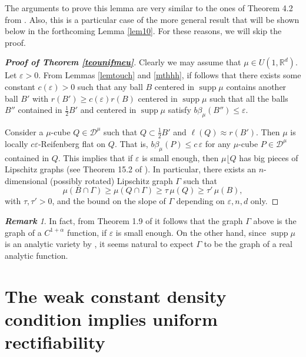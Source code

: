 \documentclass[11pt]{amsart}
\newcommand{\R}{{\mathbb R}}       %
\newcommand{\DD}{{\mathcal D}}
\newcommand{\supp}{\operatorname{supp}}
\newcommand{\ve}{{\varepsilon}}
\newcommand{\vv}{{\vspace{2mm}}}
\newcommand{\vvv}{\vspace{4mm}}
\newcommand{\rest}{{\lfloor}}
\theoremstyle{definition}
\theoremstyle{remark}
\newtheorem{rem}[theorem]{\bf Remark}
\numberwithin{equation}{section}
\begin{document}
The arguments to prove this lemma are very similar to the ones of Theorem 4.2 from \cite{PTT}. Also, this is a particular case of the more general result that will be shown below in 
the forthcoming Lemma \ref{lem10}. For these reasons, we will skip the proof.

\vv

\begin{proof}[\bf Proof of Theorem \ref{teounifmeu}]
Clearly we may assume that $\mu\in U(1,\R^d)$.
Let $\ve>0$.
From Lemmas \ref{lemtouch} and \ref{mthhh}, if follows that there exists some constant $c(\ve)>0$ 
such that any ball $B$ centered in  $\supp\mu$ contains another ball
$B'$ with $r(B')\geq c(\ve)r(B)$ centered in  $\supp\mu$ such that all the balls $B''$ contained in 
$\frac12B'$
and centered in $\supp\mu$ 
satisfy $b\beta_\mu(B'')\leq\ve$.

Consider a $\mu$-cube  $Q\in\DD^\mu$ such that $Q\subset \frac12B'$ and 
$\ell(Q)\approx r(B')$. Then
$\mu$ is  locally $c\ve$-Reifenberg flat on $Q$. That is, $b\beta_\mu (P)\leq c\,\ve$ for any
$\mu$-cube $P\in\DD^\mu$ contained in $Q$. This implies that if $\ve$ is small enough, then $\mu\rest Q$ has big
pieces of Lipschitz graphs (see Theorem 15.2 of \cite{DT}). In particular, there exists
an $n$-dimensional (possibly rotated) Lipschitz graph $\Gamma$ such that 
$$\mu(B\cap\Gamma)\geq\mu(Q\cap\Gamma)\geq\tau\,\mu(Q) \geq \tau' \,\mu(B),$$ with $\tau,\tau'>0$, 
and the bound on the slope of $\Gamma$ depending on 
$\ve,n,d$ only. 
\end{proof}

\vv


\begin{rem}
In fact, from Theorem 1.9 of \cite{PTT} it follows that the graph $\Gamma$ above is the graph of
a $C^{1+\alpha}$ function, if $\ve$ is small enough. On the other hand, since $\supp\mu$ is an analytic
variety by \cite{KiP}, it seems natural to expect $\Gamma$ to be the graph of a real analytic function.
\end{rem}
\vvv




\section{The weak constant density condition implies uniform rectifiability}
\end{document}
